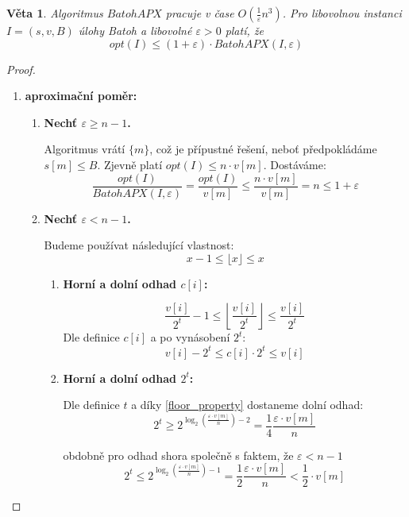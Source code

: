 \documentclass[11pt]{report} %
\newtheorem{theorem}{Věta}[section]
\numberwithin{equation}{section}
\begin{document}
\begin{theorem}
Algoritmus $BatohAPX$ pracuje v čase $O(\frac{1}{\varepsilon}n^3)$. Pro libovolnou instanci $I = (s, v, B)$ úlohy Batoh a libovolné $\varepsilon > 0$ platí, že 
$$opt(I) \leq (1 + \varepsilon)\cdot BatohAPX(I, \varepsilon)$$
\end{theorem}
\begin{proof}~
\begin{enumerate}
\item \textbf{aproximační poměr:}
\begin{enumerate}
	\item \textbf{Nechť $\varepsilon \geq n-1$.}
	
	Algoritmus vrátí $\{m\}$, což je přípustné řešení, neboť předpokládáme $s[m] \leq B$. Zjevně platí $opt(I) \leq n \cdot v[m]$. Dostáváme:
	$$\frac{opt(I)}{BatohAPX(I,\varepsilon)} = \frac{opt(I)}{v[m]} \leq \frac{n \cdot v[m]}{v[m]} = n \leq 1+\varepsilon$$
	
	\item \textbf{Nechť $\varepsilon < n-1$.}
	
	Budeme používat následující vlastnost: 
	\begin{equation}
	\label{floor_property}
	x - 1 \leq \lfloor x \rfloor \leq x
	\end{equation}
	
	\begin{enumerate}
		\item \textbf{Horní a dolní odhad $c[i]$:}
		
		$$\frac{v[i]}{2^t} - 1 \leq \left\lfloor \frac{v[i]}{2^t} \right\rfloor \leq \frac{v[i]}{2^t}$$
		Dle definice $c[i]$ a po vynásobení $2^t$:
		\begin{equation}
		\label{c_bounds}
		v[i] - 2^t \leq c[i] \cdot 2^t \leq v[i]
		\end{equation}
		
		\item \textbf{Horní a dolní odhad $2^t$:}
		
		Dle definice $t$ a díky \ref{floor_property} dostaneme dolní odhad:
		\begin{equation}
			\label{2t_bottom}
			2^t \geq 2^{\log_2(\frac{\varepsilon \cdot v[m]}{n}) - 2} = \frac{1}{4} \frac{\varepsilon \cdot v[m]}{n}
		\end{equation}
		
		obdobně pro odhad shora společně s faktem, že $\varepsilon < n-1$		
		\begin{equation}
		\label{2t_upper}
		2^t \leq 2^{\log_2(\frac{\varepsilon \cdot v[m]}{n}) - 1} = \frac{1}{2} \frac{\varepsilon \cdot v[m]}{n} < \frac{1}{2} \cdot v[m]
		\end{equation}
		

\end{enumerate}
\end{enumerate}
\end{enumerate}
\end{proof}
\end{document}
